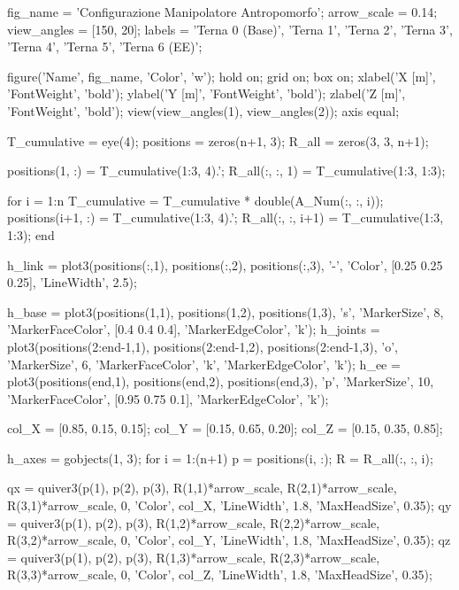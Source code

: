 \documentclass[11pt, a4paper]{article}
\begin{document}
\begin{matlabcode}
fig_name    = 'Configurazione Manipolatore Antropomorfo';
arrow_scale = 0.14;
view_angles = [150, 20];
labels      = {'Terna 0 (Base)', 'Terna 1', 'Terna 2', 'Terna 3', 'Terna 4', 'Terna 5', 'Terna 6 (EE)'};

figure('Name', fig_name, 'Color', 'w');
hold on;
grid on;
box on;
xlabel('X [m]', 'FontWeight', 'bold');
ylabel('Y [m]', 'FontWeight', 'bold');
zlabel('Z [m]', 'FontWeight', 'bold');
view(view_angles(1), view_angles(2));
axis equal;

T_cumulative = eye(4);
positions = zeros(n+1, 3);
R_all     = zeros(3, 3, n+1);

positions(1, :) = T_cumulative(1:3, 4).';
R_all(:, :, 1)  = T_cumulative(1:3, 1:3);

for i = 1:n
    T_cumulative = T_cumulative * double(A_Num(:, :, i));
    positions(i+1, :) = T_cumulative(1:3, 4).';
    R_all(:, :, i+1)  = T_cumulative(1:3, 1:3);
end

h_link = plot3(positions(:,1), positions(:,2), positions(:,3), '-',  'Color', [0.25 0.25 0.25], 'LineWidth', 2.5);

h_base = plot3(positions(1,1), positions(1,2), positions(1,3), 's',
    'MarkerSize', 8, 'MarkerFaceColor', [0.4 0.4 0.4], 'MarkerEdgeColor', 'k');
h_joints = plot3(positions(2:end-1,1), positions(2:end-1,2), positions(2:end-1,3), 'o',
    'MarkerSize', 6, 'MarkerFaceColor', 'k', 'MarkerEdgeColor', 'k');
h_ee = plot3(positions(end,1), positions(end,2), positions(end,3), 'p',
    'MarkerSize', 10, 'MarkerFaceColor', [0.95 0.75 0.1], 'MarkerEdgeColor', 'k');

col_X = [0.85, 0.15, 0.15];
col_Y = [0.15, 0.65, 0.20];
col_Z = [0.15, 0.35, 0.85];

h_axes = gobjects(1, 3);
for i = 1:(n+1)
    p = positions(i, :);
    R = R_all(:, :, i);

    qx = quiver3(p(1), p(2), p(3), R(1,1)*arrow_scale, R(2,1)*arrow_scale, R(3,1)*arrow_scale, 0,
        'Color', col_X, 'LineWidth', 1.8, 'MaxHeadSize', 0.35);
    qy = quiver3(p(1), p(2), p(3), R(1,2)*arrow_scale, R(2,2)*arrow_scale, R(3,2)*arrow_scale, 0,
        'Color', col_Y, 'LineWidth', 1.8, 'MaxHeadSize', 0.35);
    qz = quiver3(p(1), p(2), p(3), R(1,3)*arrow_scale, R(2,3)*arrow_scale, R(3,3)*arrow_scale, 0,
        'Color', col_Z, 'LineWidth', 1.8, 'MaxHeadSize', 0.35);


\end{matlabcode}
\end{document}
